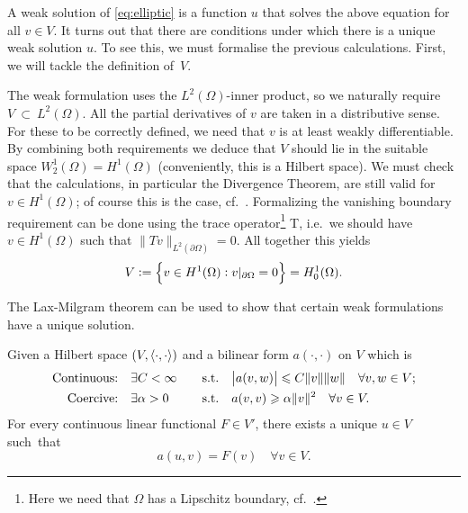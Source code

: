 \documentclass[thesis.tex]{subfiles}
\begin{document}
A weak solution of \eqref{eq:elliptic} is a function $u$ that solves the above equation for all $v \in V$.
It turns out that there are conditions under which there is a unique weak solution $u$. To see this,
we must formalise the previous calculations. First, we will tackle the definition of~$V$.

The weak formulation uses the $L^2(\Omega)$-inner product, so we naturally require~$V~\subset~L^2(\Omega)$.
All the partial derivatives of $v$ are taken in a distributive sense.
For these to be correctly defined, we need that $v$ is at least weakly differentiable.
By combining both requirements we deduce that $V$ should lie in the suitable space 
$W_2^1(\Omega) = H^1(\Omega)$ (conveniently, this is a Hilbert space).
We must check that the calculations, in particular the Divergence Theorem, are still valid for $v \in H^1(\Omega)$;
of course this is the case, cf.~\cite[Ch. 5]{brenner}.
Formalizing the vanishing boundary requirement can be done using the trace operator\footnote{Here we need that $\Omega$ has a Lipschitz boundary, cf.~\cite[Ch. 1.6]{brenner}.} T,
i.e.~we should have $v \in H^1(\Omega)$ such that $\|Tv\|_{L^2(\partial \Omega)} = 0$. All together this yields
\[
  V := \set{v \in H^1(\Omega): v|_{\partial \Omega} = 0} = H_0^1(\Omega).
\]

The Lax-Milgram theorem can be used to show that certain weak formulations have a unique solution.
\begin{thm}
  \label{thm:lax}
  Given a Hilbert space $(V, \langle \cdot, \cdot \rangle)$ and a bilinear form $a(\cdot,\cdot)$ on $V$ which is
  \begin{alignat*}{3}
    \text{Continuous:} \quad & \exists C < \infty \quad & \text{s.t.} \quad & \abs{a(v,w)} \leqslant C \|v\|\|w\| \quad \forall v,w \in V; \\
    \text{Coercive:}   \quad & \exists \alpha > 0 \quad &\text{s.t.} \quad & a(v,v) \geqslant \alpha \|v\|^2 \quad \forall v \in V.
  \end{alignat*}
  For every continuous linear functional $F \in V'$, there exists a unique $u \in V$ such~that
  \[
    a(u,v) = F(v) \quad \forall v\in V.
  \]
\end{thm}
\end{document}
